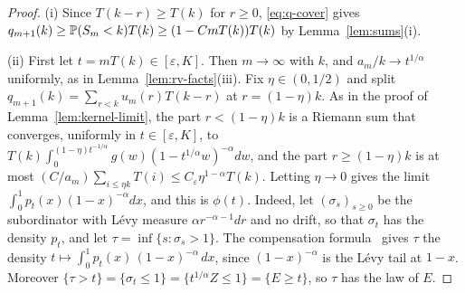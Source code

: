 \begin{proof}
(i) Since $T(k-r)\ge T(k)$ for $r\ge0$, \eqref{eq:q-cover} gives
$q_{m+1}(k)\ge\mathbb{P}(S_m<k)T(k)\ge(1-CmT(k))T(k)$ by Lemma~\ref{lem:sums}(i).

(ii) First let $t=mT(k)\in[\varepsilon,K]$. Then $m\to\infty$ with $k$, and
$a_m/k\to t^{1/\alpha}$ uniformly, as in Lemma~\ref{lem:rv-facts}(iii). Fix $\eta\in(0,1/2)$ and
split $q_{m+1}(k)=\sum_{r<k}u_m(r)T(k-r)$ at $r=(1-\eta)k$. As in the proof of
Lemma~\ref{lem:kernel-limit}, the part $r<(1-\eta)k$ is a Riemann sum that converges,
uniformly in $t\in[\varepsilon,K]$, to
$T(k)\int_0^{(1-\eta)t^{-1/\alpha}}g(w)(1-t^{1/\alpha}w)^{-\alpha}dw$, and the part
$r\ge(1-\eta)k$ is at most $(C/a_m)\sum_{i\le\eta k}T(i)\le C_\varepsilon\eta^{1-\alpha}T(k)$. Letting
$\eta\to0$ gives the limit $\int_0^1p_t(x)(1-x)^{-\alpha}dx$, and this is $\phi(t)$. Indeed, let
$(\sigma_s)_{s\ge0}$ be the subordinator with L\'evy measure $\alpha r^{-\alpha-1}dr$ and no drift, so
that $\sigma_t$ has the density $p_t$, and let $\tau=\inf\{s:\sigma_s>1\}$. The compensation
formula~\cite[Proposition~III.2]{bertoin1996} gives $\tau$ the density
$t\mapsto\int_0^1p_t(x)\,(1-x)^{-\alpha}\,dx$, since $(1-x)^{-\alpha}$ is the L\'evy tail at $1-x$.
Moreover $\{\tau>t\}=\{\sigma_t\le1\}=\{t^{1/\alpha}Z\le1\}=\{E\ge t\}$, so $\tau$ has the law of $E$.


\end{proof}

